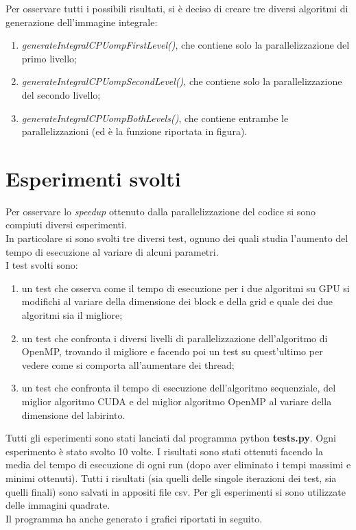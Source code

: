 \documentclass[10pt,twocolumn,letterpaper]{article}
\begin{document}
Per osservare tutti i possibili risultati, si è deciso di creare tre diversi algoritmi di generazione dell'immagine integrale:
\begin{enumerate}
\item{\textit{generateIntegralCPUompFirstLevel()}, che contiene solo la parallelizzazione del primo livello;}
\item{\textit{generateIntegralCPUompSecondLevel()}, che contiene solo la parallelizzazione del secondo livello;}
\item{\textit{generateIntegralCPUompBothLevels()}, che contiene entrambe le parallelizzazioni (ed è la funzione riportata in figura).}
\end{enumerate}

\section{Esperimenti svolti}
Per osservare lo \textit{speedup} ottenuto dalla parallelizzazione del codice si sono compiuti diversi esperimenti.\\
In particolare si sono svolti tre diversi test, ognuno dei quali studia l'aumento del tempo di esecuzione al variare di alcuni parametri.\\
I test svolti sono:
\begin{enumerate}
\item{un test che osserva come il tempo di esecuzione per i due algoritmi su GPU si modifichi al variare della dimensione dei block e della grid e quale dei due algoritmi sia il migliore;}
\item{un test che confronta i diversi livelli di parallelizzazione dell'algoritmo di OpenMP, trovando il migliore e facendo poi un test su quest'ultimo per vedere come si comporta all'aumentare dei thread;}
\item{un test che confronta il tempo di esecuzione dell'algoritmo sequenziale, del miglior algoritmo CUDA e del miglior algoritmo OpenMP al variare della dimensione del labirinto.}
\end{enumerate}
Tutti gli esperimenti sono stati lanciati dal programma python \textbf{tests.py}. Ogni esperimento è stato svolto 10 volte. I risultati sono stati ottenuti facendo la media del tempo di esecuzione di ogni run (dopo aver eliminato i tempi massimi e minimi ottenuti). Tutti i risultati (sia quelli delle singole iterazioni dei test, sia quelli finali) sono salvati in appositi file csv. Per gli esperimenti si sono utilizzate delle immagini quadrate.\\
Il programma ha anche generato i grafici riportati in seguito.
\end{document}
